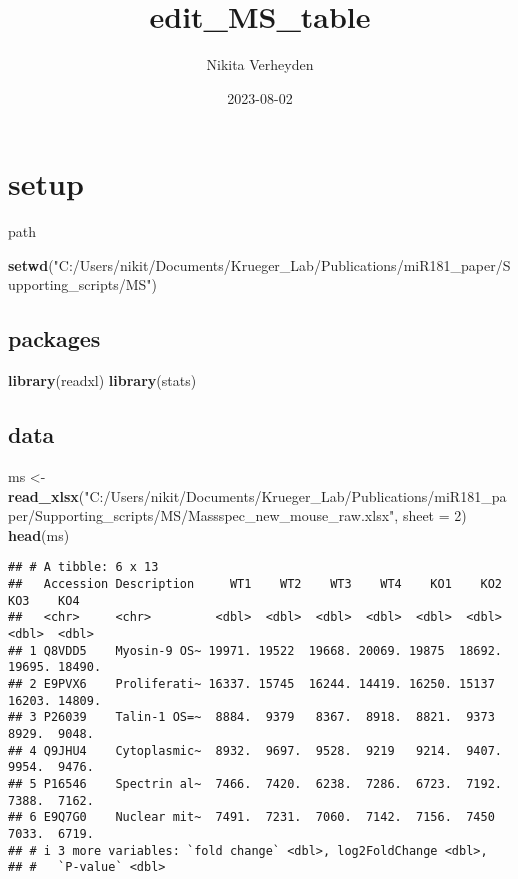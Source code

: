 \documentclass[
]{article}
\title{edit\_MS\_table}
\author{Nikita Verheyden}
\date{2023-08-02}
\newenvironment{Shaded}{\begin{snugshade}}{\end{snugshade}}
\newcommand{\AttributeTok}[1]{\textcolor[rgb]{0.13,0.29,0.53}{#1}}
\newcommand{\DecValTok}[1]{\textcolor[rgb]{0.00,0.00,0.81}{#1}}
\newcommand{\FunctionTok}[1]{\textcolor[rgb]{0.13,0.29,0.53}{\textbf{#1}}}
\newcommand{\NormalTok}[1]{#1}
\newcommand{\OtherTok}[1]{\textcolor[rgb]{0.56,0.35,0.01}{#1}}
\newcommand{\StringTok}[1]{\textcolor[rgb]{0.31,0.60,0.02}{#1}}
\begin{document}
\maketitle

\hypertarget{setup}{%
\section{setup}\label{setup}}

path

\begin{Shaded}
\begin{Highlighting}[]
\FunctionTok{setwd}\NormalTok{(}\StringTok{"C:/Users/nikit/Documents/Krueger\_Lab/Publications/miR181\_paper/Supporting\_scripts/MS"}\NormalTok{)}
\end{Highlighting}
\end{Shaded}

\hypertarget{packages}{%
\subsection{packages}\label{packages}}

\begin{Shaded}
\begin{Highlighting}[]
\FunctionTok{library}\NormalTok{(readxl)}
\FunctionTok{library}\NormalTok{(stats)}
\end{Highlighting}
\end{Shaded}

\hypertarget{data}{%
\subsection{data}\label{data}}

\begin{Shaded}
\begin{Highlighting}[]
\NormalTok{ms }\OtherTok{\textless{}{-}} \FunctionTok{read\_xlsx}\NormalTok{(}\StringTok{"C:/Users/nikit/Documents/Krueger\_Lab/Publications/miR181\_paper/Supporting\_scripts/MS/Massspec\_new\_mouse\_raw.xlsx"}\NormalTok{, }\AttributeTok{sheet =} \DecValTok{2}\NormalTok{)}
\FunctionTok{head}\NormalTok{(ms)}
\end{Highlighting}
\end{Shaded}

\begin{verbatim}
## # A tibble: 6 x 13
##   Accession Description     WT1    WT2    WT3    WT4    KO1    KO2    KO3    KO4
##   <chr>     <chr>         <dbl>  <dbl>  <dbl>  <dbl>  <dbl>  <dbl>  <dbl>  <dbl>
## 1 Q8VDD5    Myosin-9 OS~ 19971. 19522  19668. 20069. 19875  18692. 19695. 18490.
## 2 E9PVX6    Proliferati~ 16337. 15745  16244. 14419. 16250. 15137  16203. 14809.
## 3 P26039    Talin-1 OS=~  8884.  9379   8367.  8918.  8821.  9373   8929.  9048.
## 4 Q9JHU4    Cytoplasmic~  8932.  9697.  9528.  9219   9214.  9407.  9954.  9476.
## 5 P16546    Spectrin al~  7466.  7420.  6238.  7286.  6723.  7192.  7388.  7162.
## 6 E9Q7G0    Nuclear mit~  7491.  7231.  7060.  7142.  7156.  7450   7033.  6719.
## # i 3 more variables: `fold change` <dbl>, log2FoldChange <dbl>,
## #   `P-value` <dbl>
\end{verbatim}
\end{document}
